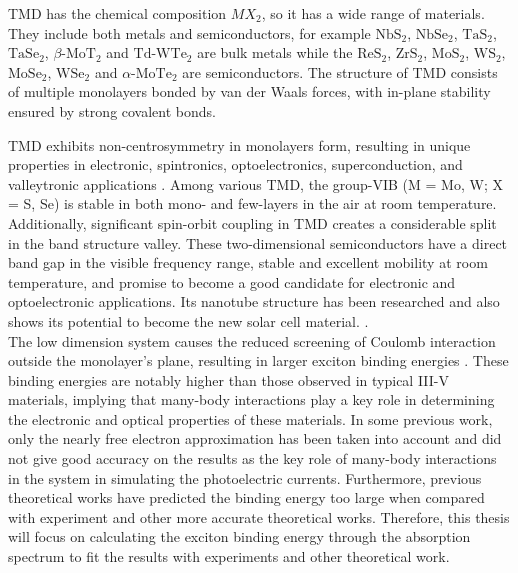 \documentclass[12pt,english,a4paper]{article}
\begin{document}
\quad TMD has the chemical composition $MX_2$, so it has a wide range of materials. They include both metals and semiconductors, for example $\mathrm{NbS}_2$, $\mathrm{NbSe}_2$, $\mathrm{TaS}_2$, $\mathrm{TaSe}_2$, $\beta$-$\mathrm{MoT}_2$ and $\mathrm{Td}$-$\mathrm{WTe}_2$ are bulk metals while the $\mathrm{ReS}_2$, $\mathrm{ZrS}_2$, $\mathrm{MoS}_2$, $\mathrm{WS}_2$, $\mathrm{MoSe}_2$, $\mathrm{WSe}_2$ and $\alpha$-$\mathrm{MoTe}_2$ are semiconductors. The structure of TMD consists of multiple monolayers bonded by van der Waals forces, with in-plane stability ensured by strong covalent bonds.

\quad TMD exhibits non-centrosymmetry in monolayers form, resulting in unique properties in electronic, spintronics, optoelectronics, superconduction, and valleytronic applications \cite{xiao_valley-contrasting_2007,yao_valley-dependent_2008}. Among various TMD, the group-VIB (M = Mo, W; X = S, Se) is stable in both mono- and few-layers in the air at room temperature\cite{geim_van_2013}. Additionally, significant spin-orbit coupling in TMD creates a considerable split in the band structure valley. These two-dimensional semiconductors have a direct band gap in the visible frequency range, stable and excellent mobility at room temperature\cite{jiang_flexo-photovoltaic_2021, wang_electronics_2012}, and promise to become a good candidate for electronic and optoelectronic applications. Its nanotube structure has been researched and also shows its potential to become the new solar cell material\cite{kim_giant_2022,zhang_enhanced_2019,jiang_flexo-photovoltaic_2021,yang_spontaneous-polarization-induced_2022}. .\\\null
\quad The low dimension system causes the reduced screening of Coulomb interaction outside the monolayer's plane, resulting in larger exciton binding energies \cite{kirichenko_influence_2021, zhang_absorption_2014}. These binding energies are notably higher than those observed in typical III-V materials, implying that many-body interactions play a key role in determining the electronic and optical properties of these materials. In some previous work, only the nearly free electron approximation has been taken into account and did not give good accuracy on the results as the key role of many-body interactions in the system in simulating the photoelectric currents. Furthermore, previous theoretical works have predicted the binding energy too large\cite{ramasubramaniam_large_2012,qiu_optical_2013,cheiwchanchamnangij_quasiparticle_2012, shi_quasiparticle_2013} when compared with experiment\cite{zhang_absorption_2014} and other more accurate theoretical works\cite{zhang_absorption_2014, kirichenko_influence_2021,  Exper_for_quasi-bandgap}. Therefore, this thesis will focus on calculating the exciton binding energy through the absorption spectrum to fit the results with experiments and other theoretical work.\\\null
\end{document}

